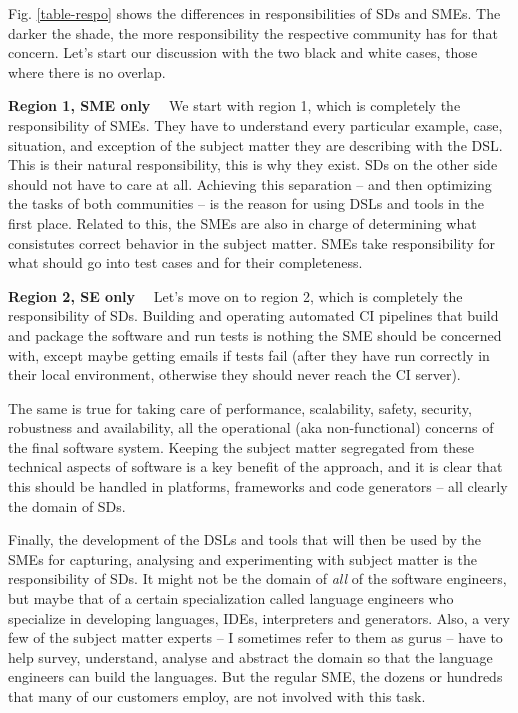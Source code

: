 \documentclass[runningheads]{llncs}
\newcommand\parhead[1]{\vspace{1mm}\noindent\textbf{{#1}}\ \ }
\newcommand{\fig}[1]{Fig. \ref{#1}}  %
\begin{document}
\fig{table-respo} shows the differences in responsibilities of SDs and SMEs. The
darker the shade, the more responsibility the respective community has for that
concern. Let's start our discussion with the two black and white cases, those
where there is no overlap.


\parhead{Region 1, SME only} We start with region 1, which is completely the
responsibility of SMEs. They have to understand every particular example, case,
situation, and exception of the subject matter they are describing with the DSL.
This is their natural responsibility, this is why they exist. SDs on the other
side should not have to care at all. Achieving this separation -- and then
optimizing the tasks of both communities -- is the reason for using DSLs and
tools in the first place. Related to this, the SMEs are also in charge of
determining what consistutes correct behavior in the subject matter.
SMEs take responsibility for what should go into test cases and for their
completeness.

\parhead{Region 2, SE only} Let's move on to region 2, which is completely the
responsibility of SDs.
Building and operating automated CI pipelines that build and package the
software and run tests is nothing the SME should be concerned with, except maybe
getting emails if tests fail (after they have run correctly in their local
environment, otherwise they should never reach the CI server).
 
The same is true for taking care of performance, scalability, 
safety, security, robustness and availability, all the operational
(aka non-functional) concerns of the final software system. Keeping the
subject matter segregated from these technical aspects of software is
a key benefit of the approach, and it is clear that this should be 
handled in platforms, frameworks and code generators -- all clearly
the domain of SDs.

Finally, the development of the DSLs and tools that will then be used by the
SMEs for capturing, analysing and experimenting with subject matter is the
responsibility of SDs. It might not be the domain of \emph{all} of the software
engineers, but maybe that of a certain specialization called language engineers
who specialize in developing languages, IDEs, interpreters and generators. Also,
a very few of the subject matter experts -- I sometimes refer to them as gurus
-- have to help survey, understand, analyse and abstract the domain so that the
language engineers can build the languages. But the regular SME, the dozens or
hundreds that many of our customers employ, are not involved with this task.
\end{document}
